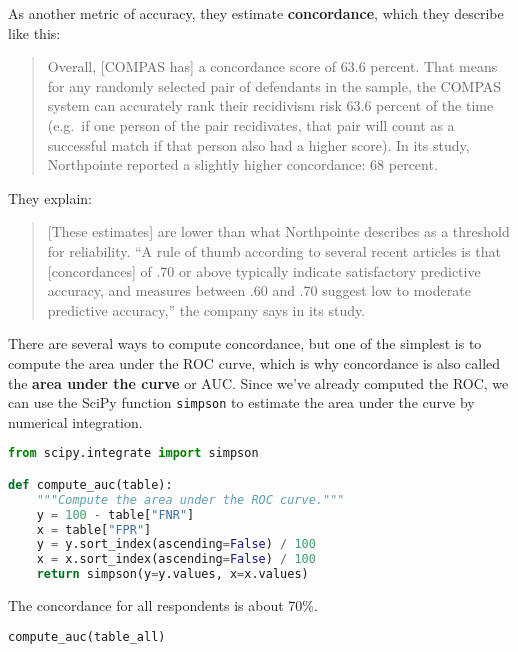 As another metric of accuracy, they estimate \textbf{concordance}, which
they describe like this:

\begin{quote}
Overall, {[}COMPAS has{]} a concordance score of 63.6 percent. That
means for any randomly selected pair of defendants in the sample, the
COMPAS system can accurately rank their recidivism risk 63.6 percent of
the time (e.g.~if one person of the pair recidivates, that pair will
count as a successful match if that person also had a higher score). In
its study, Northpointe reported a slightly higher concordance: 68
percent.
\end{quote}

They explain:

\begin{quote}
{[}These estimates{]} are lower than what Northpointe describes as a
threshold for reliability. ``A rule of thumb according to several recent
articles is that {[}concordances{]} of .70 or above typically indicate
satisfactory predictive accuracy, and measures between .60 and .70
suggest low to moderate predictive accuracy,'' the company says in its
study.
\end{quote}

There are several ways to compute concordance, but one of the simplest
is to compute the area under the ROC curve, which is why concordance is
also called the \textbf{area under the curve} or AUC. Since we've
already computed the ROC, we can use the SciPy function
\passthrough{\lstinline!simpson!} to estimate the area under the curve
by numerical integration.

\begin{lstlisting}[language=Python,style=source]
from scipy.integrate import simpson

def compute_auc(table):
    """Compute the area under the ROC curve."""
    y = 100 - table["FNR"]
    x = table["FPR"]
    y = y.sort_index(ascending=False) / 100
    x = x.sort_index(ascending=False) / 100
    return simpson(y=y.values, x=x.values)
\end{lstlisting}

\pagebreak

The concordance for all respondents is about 70\%.

\begin{lstlisting}[language=Python,style=source]
compute_auc(table_all)
\end{lstlisting}

